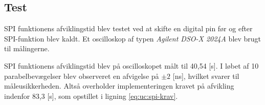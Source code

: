
\subsection{Test} 
%
%
%
%
%
%
SPI funktionens afviklingstid blev testet ved at skifte en digital pin før og efter SPI-funktion blev kaldt.
Et oscilloskop af typen \textit{Agilent DSO-X 2024A} blev brugt til målingerne. 

SPI funktionens afviklingstid blev på oscilloskopet målt til 40,54 [\micro s].
I løbet af 10 parabelbevægelser blev observeret en afvigelse på \(\pm2\) [ns], hvilket svarer til måleusikkerheden. 
Altså overholder implementeringen kravet på afvikling indenfor 83,3 [\micro s], som opstillet i ligning \ref{eq:uc:spi-krav}.

